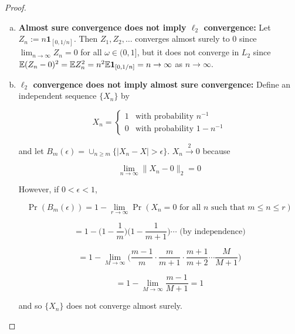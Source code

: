 
\begin{proof}


\begin{enumerate}[(a)]

\item \textbf{Almost sure convergence does not imply \(\ell_2\) convergence:} Let \(Z_n := n \boldsymbol{1}_{[0,1/n]}\). Then \(Z_1, Z_2, \ldots\) converges almost surely to 0 since \(\lim_{n \to \infty} Z_n = 0\) for all \(\omega \in (0,1]\), but it does not converge in \(L_2\) since \(\mathbb{E}(Z_n -0)^2 = \mathbb{E} Z_n^2 = n^2 \mathbb{E} \boldsymbol{1}_{[0,1/n]} = n \to \infty\) as \(n \to \infty\).


\item \textbf{\(\ell_2\) convergence does not imply almost sure convergence:} Define an independent sequence \(\{X_n\}\) by

\[
X_n = \begin{cases}
1 & \text{with probability } n^{-1} \\
0 & \text{with probability } 1 - n^{-1}
\end{cases}
\]

and let \(B_m(\epsilon) = \cup_{n \geq m} \{|X_n - X| > \epsilon\}\). \(X_n \xrightarrow{2} 0\) because

\[
\lim_{n \to \infty} \lVert X_n - 0 \rVert _2 = 0
\]


However, if \(0 < \epsilon < 1\),

\[
\Pr(B_m(\epsilon)) = 1 - \lim_{r \to \infty} \Pr(X_n = 0 \text{ for all } n \text{ such that } m \leq n \leq r)
\]

\[
=1 - \bigg( 1 - \frac{1}{m} \bigg)\bigg(1 - \frac{1}{m+1} \bigg) \cdots \text{ (by independence)}
\]

\[
= 1 - \lim_{M \to \infty}\bigg( \frac{m-1}{m} \cdot \frac{m}{m+1} \cdot \frac{m+1}{m+2} \cdots \frac{M}{M +1} \bigg)
\]

\[
= 1 - \lim_{M \to \infty} \frac{m-1}{M +1} = 1
\]

and so \(\{X_n\}\) does not converge almost surely.

\end{enumerate}

\end{proof}

